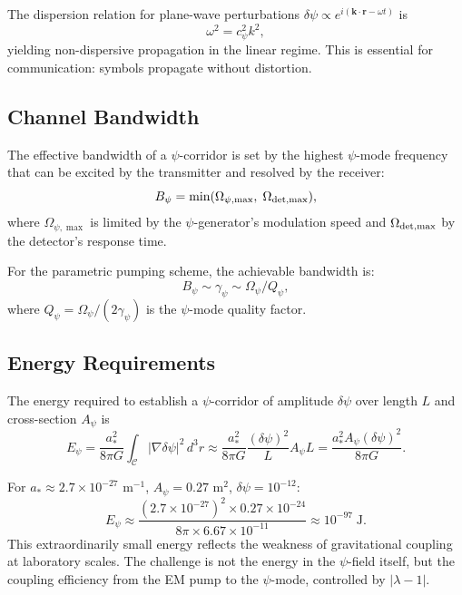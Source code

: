 \documentclass[twocolumn,superscriptaddress,prd,nofootinbib]{revtex4-2}
\newcommand{\astar}{a_*}
\newcommand{\Corridor}{\mathcal{C}}
\begin{document}
The dispersion relation for plane-wave perturbations
$\delta\psi \propto e^{i(\mathbf{k}\cdot\mathbf{r} - \omega t)}$ is
\begin{equation}
\omega^2 = c_\psi^2 k^2,
\label{eq:dispersion}
\end{equation}
yielding non-dispersive propagation in the linear regime.
This is essential for communication: symbols propagate without
distortion.

\subsection{Channel Bandwidth}

The effective bandwidth of a $\psi$-corridor is set by the highest
$\psi$-mode frequency that can be excited by the transmitter and
resolved by the receiver:
\begin{equation}
B_\psi = \min(\Omega_{\psi,\max},\;\Omega_{\rm det,max}),
\label{eq:bandwidth}
\end{equation}
where $\Omega_{\psi,\max}$ is limited by the $\psi$-generator's
modulation speed and $\Omega_{\rm det,max}$ by the detector's response
time.

For the parametric pumping scheme, the achievable bandwidth is:
\begin{equation}
B_\psi \sim \gamma_\psi \sim \Omega_\psi / Q_\psi,
\label{eq:bandwidth-estimate}
\end{equation}
where $Q_\psi = \Omega_\psi / (2\gamma_\psi)$ is the $\psi$-mode
quality factor.

\subsection{Energy Requirements}

The energy required to establish a $\psi$-corridor of amplitude
$\delta\psi$ over length $L$ and cross-section $A_\psi$ is
\begin{equation}
E_\psi = \frac{\astar^2}{8\pi G}\int_\Corridor
|\nabla\delta\psi|^2\,d^3r
\approx \frac{\astar^2}{8\pi G}\frac{(\delta\psi)^2}{L} A_\psi L
= \frac{\astar^2 A_\psi (\delta\psi)^2}{8\pi G}.
\label{eq:corridor-energy}
\end{equation}

For $\astar \approx 2.7 \times 10^{-27}$ m$^{-1}$,
$A_\psi = 0.27$ m$^2$, $\delta\psi = 10^{-12}$:
\begin{equation}
E_\psi \approx \frac{(2.7\times 10^{-27})^2 \times 0.27 \times 10^{-24}}
{8\pi \times 6.67 \times 10^{-11}}
\approx 10^{-97}\;\text{J}.
\label{eq:energy-value}
\end{equation}
This extraordinarily small energy reflects the weakness of gravitational
coupling at laboratory scales.
The challenge is not the energy in the $\psi$-field itself, but the
coupling efficiency from the EM pump to the $\psi$-mode, controlled by
$|\lambda - 1|$.
\end{document}
